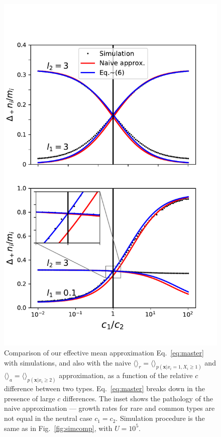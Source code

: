 \documentclass[12pt]{article}
\begin{document}
\begin{figure}
\centering
\includegraphics[scale=0.8]{approx_details.pdf}
\caption{\label{fig:approx_details} Comparison of our effective mean approximation Eq.~\eqref{eq:master} with simulations, and also with the naive $\langle \rangle_r=\langle\rangle_{p({\mathbf x}|x_i=1,X_i\geq 1)}$ and $\langle\rangle_a=\langle\rangle_{p({\mathbf x}|x_i\geq 2)}$ approximation, as a function of the relative $c$ difference between two types. Eq.~\eqref{eq:master} breaks down in the presence of large $c$ differences. The inset shows the pathology of the naive approximation --- growth rates for rare and common types are not equal in the neutral case $c_1=c_2$. Simulation procedure is the same as in Fig.~\ref{fig:simcomp}, with $U=10^5$.}
\end{figure}
\end{document}
